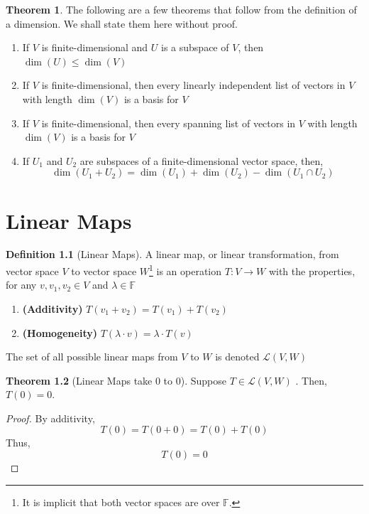 \documentclass[12pt]{report}
\numberwithin{equation}{section}
\theoremstyle{definition}
\newtheorem{theorem}{Theorem}[section]
\newtheorem{definition}[theorem]{Definition}
\begin{document}
\begin{theorem} The following are a few theorems that follow from the definition of a dimension. We shall state them here without proof.
	\begin{enumerate}
		\item If $ V $ is finite-dimensional and $ U $ is a subspace of $ V $, then $ \dim(U)\leq \dim (V)$
		\item If $ V $ is finite-dimensional, then every linearly independent list of vectors in $ V $ with length $ \dim(V) $ is a basis for $ V $
		\item If $ V $ is finite-dimensional, then every spanning list of vectors in $ V $ with length $ \dim(V) $ is a basis for $ V $
		\item If $ U_1 $ and $ U_2 $ are subspaces of a finite-dimensional vector space, then,
		\begin{equation}
				\dim(U_1 + U_2) = \dim(U_1) + \dim(U_2) - \dim(U_1 \cap U_2)
		\end{equation}
	\end{enumerate}
\end{theorem}

\chapter{Linear Maps}

\begin{definition}[Linear Maps]
	A linear map, or linear transformation, from vector space $ V $ to vector space $ W $\footnote{It is implicit that both vector spaces are over $ \mathbb{F} $.} is an operation $ T:V\to W $ with the properties, for any $ v, v_1, v_2\in V $ and $ \lambda\in \mathbb{F} $
	\begin{enumerate}[label=P\arabic*, start=1]   
		\item \textbf{(Additivity)} $ T(v_1 + v_2) = T(v_1) + T(v_2) $
		\item \textbf{(Homogeneity)} $ T(\lambda\cdot v)  = \lambda \cdot T(v)$
	\end{enumerate}
	
	The set of all possible linear maps from $ V $ to $ W $ is denoted $ \mathcal{L}(V,W) $
\end{definition}

\begin{theorem}[Linear Maps take 0 to 0]
	Suppose $ T\in \mathcal{L}(V,W) $ . Then, $T(0) = 0 $.
	\label{thm:0t0}
\end{theorem}
\begin{proof}
	By additivity,
	\begin{equation}
			T(0) = T(0+0) = T(0) + T(0)
	\end{equation}
	Thus,
	\begin{equation}
			T(0) = 0
	\end{equation}
\end{proof}
\end{document}
